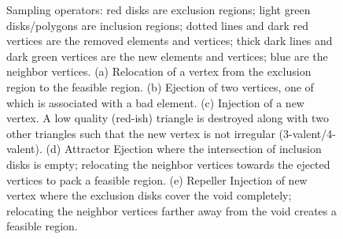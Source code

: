 \documentclass[a4paper,10pt]{article}
\begin{document}
\begin{figure}[!tb]
	\caption{Sampling operators: red disks are exclusion regions; light green disks/polygons are inclusion regions; dotted lines and dark red vertices are the removed elements and vertices; thick dark lines and dark green vertices are the new elements and vertices; blue are the neighbor vertices. (a) Relocation of a vertex from the exclusion region to the feasible region. (b) Ejection of two vertices, one of which is associated with a bad element. (c) Injection of a new vertex. A low quality (red-ish) triangle is destroyed along with two other triangles such that the new vertex is not irregular (3-valent/4-valent). (d) Attractor Ejection where the intersection of inclusion disks is empty; relocating the neighbor vertices towards the ejected vertices to pack a feasible region. (e) Repeller Injection of new vertex where the exclusion disks cover the void completely; relocating the neighbor vertices farther away from the void creates a feasible region.}

\end{figure}
\end{document}
